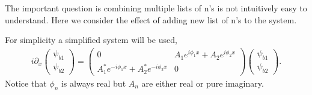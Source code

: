 \documentclass[letterpaper,12pt,english]{sphinxmanual}
\begin{document}
The important question is combining multiple lists of n's is not intuitively easy to understand. Here we consider the effect of adding new list of n's to the system.

For simplicity a simplified system will be used,
\begin{equation*}
\begin{split}i\partial_x  \begin{pmatrix}
\psi_{b1} \\
\psi_{b2}
\end{pmatrix} = \begin{pmatrix}
0 & A_1 e^{ i \phi_1 x } +A_2 e^{ i \phi_2 x } \\
A_1^* e^{ - i \phi_1 x } + A_2^* e^{ -i \phi_2 x } & 0
\end{pmatrix}
\begin{pmatrix}
\psi_{b1} \\
\psi_{b2}
\end{pmatrix}.\end{split}
\end{equation*}
Notice that \(\phi_n\) is always real but \(A_n\) are either real or pure imaginary.
\end{document}
